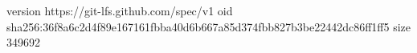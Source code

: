 version https://git-lfs.github.com/spec/v1
oid sha256:36f8a6c2d4f89e167161fbba40d6b667a85d374fbb827b3be22442dc86ff1ff5
size 349692
